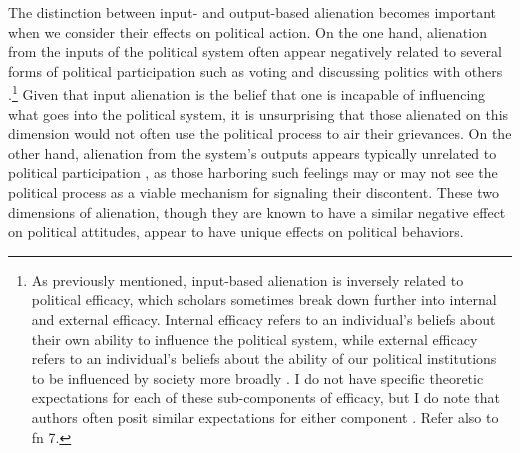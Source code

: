\documentclass[12pt]{article}
\begin{document}
The distinction between input- and output-based alienation becomes important when we consider their effects on political action. On the one hand, alienation from the inputs of the political system often appear negatively related to several forms of political participation such as voting \parencite{horton1962powerlessness,aberbach1969alienation,southwell1998electoral} and discussing politics with others \parencite{olsen1969,finifter1970dimensions}.\footnote{As previously mentioned, input-based alienation is inversely related to political efficacy, which scholars sometimes break down further into internal and external efficacy. Internal efficacy refers to an individual's beliefs about their own ability to influence the political system, while external efficacy refers to an individual's beliefs about the ability of our political institutions to be influenced by society more broadly \parencites{southwell1998electoral}. I do not have specific theoretic expectations for each of these sub-components of efficacy, but I do note that authors often posit similar expectations for either component \parencite{fox2020political,southwell1998electoral}. Refer also to fn 7.} Given that input alienation is the belief that one is incapable of influencing what goes into the political system, it is unsurprising that those alienated on this dimension would not often use the political process to air their grievances. On the other hand, alienation from the system's outputs appears typically unrelated to political participation \parencite{finifter1970dimensions,olsen1969}, as those harboring such feelings may or may not see the political process as a viable mechanism for signaling their discontent. These two dimensions of alienation, though they are known to have a similar negative effect on political attitudes, appear to have unique effects on political behaviors.
\end{document}
